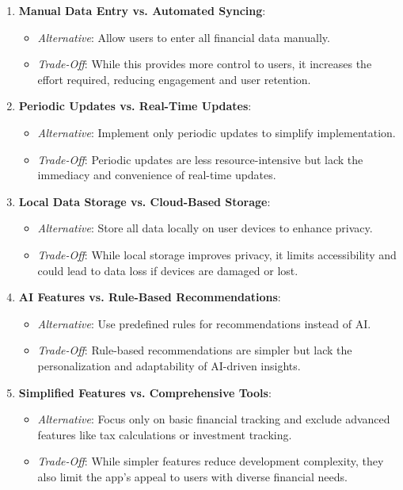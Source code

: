 \begin{enumerate}
    \item \textbf{Manual Data Entry vs. Automated Syncing}:
    \begin{itemize}
        \item \textit{Alternative}: Allow users to enter all financial data manually.
        \item \textit{Trade-Off}: While this provides more control to users, it increases the effort required, reducing engagement and user retention.
    \end{itemize}

    \item \textbf{Periodic Updates vs. Real-Time Updates}:
    \begin{itemize}
        \item \textit{Alternative}: Implement only periodic updates to simplify implementation.
        \item \textit{Trade-Off}: Periodic updates are less resource-intensive but lack the immediacy and convenience of real-time updates.
    \end{itemize}

    \item \textbf{Local Data Storage vs. Cloud-Based Storage}:
    \begin{itemize}
        \item \textit{Alternative}: Store all data locally on user devices to enhance privacy.
        \item \textit{Trade-Off}: While local storage improves privacy, it limits accessibility and could lead to data loss if devices are damaged or lost.
    \end{itemize}

    \item \textbf{AI Features vs. Rule-Based Recommendations}:
    \begin{itemize}
        \item \textit{Alternative}: Use predefined rules for recommendations instead of AI.
        \item \textit{Trade-Off}: Rule-based recommendations are simpler but lack the personalization and adaptability of AI-driven insights.
    \end{itemize}

    \item \textbf{Simplified Features vs. Comprehensive Tools}:
    \begin{itemize}
        \item \textit{Alternative}: Focus only on basic financial tracking and exclude advanced features like tax calculations or investment tracking.
        \item \textit{Trade-Off}: While simpler features reduce development complexity, they also limit the app’s appeal to users with diverse financial needs.
    \end{itemize}
\end{enumerate}





